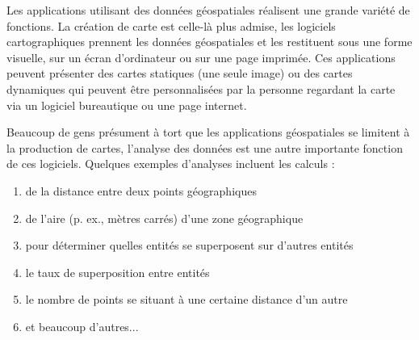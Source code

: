 Les applications utilisant des donn\'ees g\'eospatiales r\'ealisent une grande vari\'et\'e de fonctions. La cr\'eation de carte est celle-l\`a plus admise, les logiciels cartographiques prennent les donn\'ees g\'eospatiales et les restituent sous une forme visuelle, sur un \'ecran d'ordinateur ou sur une page imprim\'ee.
Ces applications peuvent pr\'esenter des cartes statiques (une seule image) ou des cartes dynamiques qui peuvent \^etre personnalis\'ees par la personne regardant la carte via un logiciel bureautique ou une page internet.

Beaucoup de gens pr\'esument \`a tort que les applications g\'eospatiales se limitent \`a la production de cartes, l'analyse des donn\'ees est une autre importante fonction de ces logiciels. Quelques exemples d'analyses incluent les calculs : 


\begin{enumerate} 
\item de la distance entre deux points g\'eographiques  
\item de l'aire (p. ex., m\`etres carr\'es) d'une zone g\'eographique 
\item pour d\'eterminer quelles entit\'es se superposent sur d'autres entit\'es 
\item le taux de superposition entre entit\'es 
\item le nombre de points se situant \`a une certaine distance d'un autre 
\item et beaucoup d'autres...
\end{enumerate} 

%

